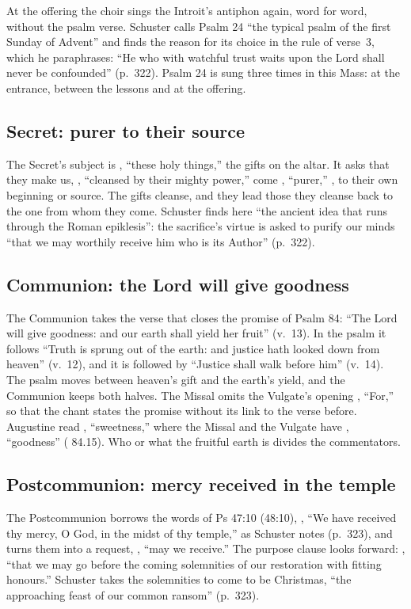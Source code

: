 At the offering the choir sings the Introit's antiphon again, word for word,
without the psalm verse. Schuster calls Psalm 24 ``the typical psalm of the
first Sunday of Advent'' and finds the reason for its choice in the rule of
verse~3, which he paraphrases: ``He who with watchful trust waits upon the
Lord shall never be confounded'' (p.~322). Psalm 24 is sung three times in
this Mass: at the entrance, between the lessons and at the offering.

\subsection{Secret: purer to their source}
\label{sec:element-secret}

The Secret's subject is , ``these holy things,'' the gifts on
the altar. It asks that they make us, ,
``cleansed by their mighty power,'' come , ``purer,''
, to their own beginning or source. The gifts
cleanse, and they lead those they cleanse back to the one from whom they
come. Schuster finds here ``the ancient idea that runs through the Roman
epiklesis'': the sacrifice's virtue is asked to purify our minds ``that we may
worthily receive him who is its Author'' (p.~322).

\subsection{Communion: the Lord will give goodness}
\label{sec:element-communion}

The Communion takes the verse that closes the promise of Psalm 84: ``The
Lord will give goodness: and our earth shall yield her fruit'' (v.~13). In the
psalm it follows ``Truth is sprung out of the earth: and justice hath looked
down from heaven'' (v.~12), and it is followed by ``Justice shall walk before
him'' (v.~14). The psalm moves between heaven's gift and the earth's yield,
and the Communion keeps both halves. The Missal omits the Vulgate's opening
, ``For,'' so that the chant states the promise without its
link to the verse before. Augustine read , ``sweetness,''
where the Missal and the Vulgate have , ``goodness''
( 84.15). Who or what the fruitful earth is divides the
commentators.

\subsection{Postcommunion: mercy received in the temple}
\label{sec:element-postcommunion}

The Postcommunion borrows the words of Ps 47:10 (48:10), , ``We have received thy mercy,
O God, in the midst of thy temple,'' as Schuster notes (p.~323), and turns
them into a request, , ``may we receive.'' The purpose
clause looks forward: , ``that we may go before the coming solemnities of our
restoration with fitting honours.'' Schuster takes the solemnities to come
to be Christmas, ``the approaching feast of our common ransom'' (p.~323).
